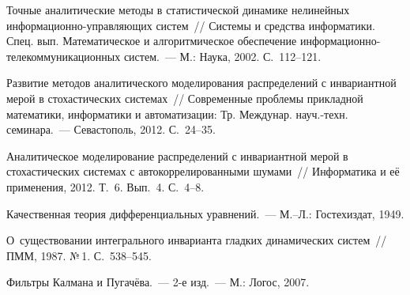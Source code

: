 \begin{multicols}{2}
{{\begin{thebibliography}{99}
Точные аналитические методы в статистической динамике нелинейных 
ин\-фор\-ма\-ци\-он\-но-управ\-ля\-ющих сис\-тем~// Сис\-те\-мы и средства информатики. 
Спец. вып. Математическое и алгоритмическое обеспечение 
ин\-фор\-ма\-ци\-он\-но-те\-ле\-ком\-му\-ни\-ка\-ци\-он\-ных сис\-тем.~--- М.: Наука, 2002. С.~112--121.

 Развитие методов аналитического моделирования распределений с 
инвариантной мерой в стохастических сис\-те\-мах~// Современные проб\-ле\-мы 
прикладной математики, информатики и автоматизации: Тр. Междунар. науч.-техн. семинара.~--- 
Севастополь, 2012. С.~24--35.

 Аналитическое моделирование распределений с инвариантной мерой 
в стохастических сис\-те\-мах с автокоррелированными шумами~// 
Информатика и её применения, 2012. Т.~6. Вып.~4. С.~4--8.

 Качественная теория дифференциальных уравнений.~--- 
М.--Л.: Гостехиздат, 1949.


 О~существовании интегрального инварианта гладких динамических систем~// 
ПММ, 1987. №\,1. С.~538--545.

\label{end\stat}

 Фильтры Калмана и Пугачёва.~--- 2-е изд.~--- М.: Логос, 2007.
\end{thebibliography}
}
}

\end{multicols}